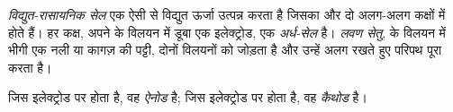 \begin{definition}[विद्युत-रासायनिक सेल, अर्ध-सेल, लवण सेतु]\label{def:g12:cells-and-electrolysis:cell}
\emph{विद्युत-रासायनिक सेल} एक ऐसी  से
विद्युत ऊर्जा उत्पन्न करता है जिसका  और 
दो अलग-अलग कक्षों में होते हैं। हर कक्ष, अपने  के विलयन में डूबा
एक  इलेक्ट्रोड, एक
\emph{अर्ध-सेल} है। \emph{लवण सेतु},
 के विलयन में भीगी एक नली या कागज़ की पट्टी, दोनों
विलयनों को जोड़ता है और उन्हें अलग रखते हुए परिपथ पूरा करता है।
\end{definition}

\begin{definition}[ऐनोड, कैथोड]\label{def:g12:cells-and-electrolysis:anode}
जिस इलेक्ट्रोड पर  होता है, वह
\emph{ऐनोड} है; जिस इलेक्ट्रोड पर  होता है,
वह \emph{कैथोड} है।
\end{definition}

